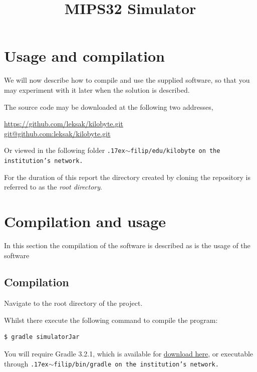 
\newcommand{\titlename}{MIPS32 Simulator}
\title{\titlename}





\tableofcontents
\clearpage






\section{Usage and compilation}

We will now describe how to compile and use the supplied software, so
that you may experiment with it later when the solution is described.

The source code may be downloaded at the following two addresses,

\begin{center}
\url{https://github.com/leksak/kilobyte.git} \\
\url{git@github.com:leksak/kilobyte.git}
\end{center}

Or viewed in the following folder
\tt{\raise.17ex\hbox{$\scriptstyle\mathtt{\sim}$}filip/edu/kilobyte}
on the institution's network.

For the duration of this report the directory created by cloning
the repository is referred to as the \emph{root directory}.

\section{Compilation and usage}

In this section the compilation of the software is described as
is the usage of the software

\subsection{Compilation}

Navigate to the root directory of the project.

Whilst there execute the following command to compile the program:

\begin{lstlisting}[style=plain]
$ gradle simulatorJar
\end{lstlisting}

You will require Gradle 3.2.1, which is available for
\href{http://gradle.org/gradle-download/}{download here}, or
executable through
\tt{\raise.17ex\hbox{$\scriptstyle\mathtt{\sim}$}filip/bin/gradle}
on the institution's network.

